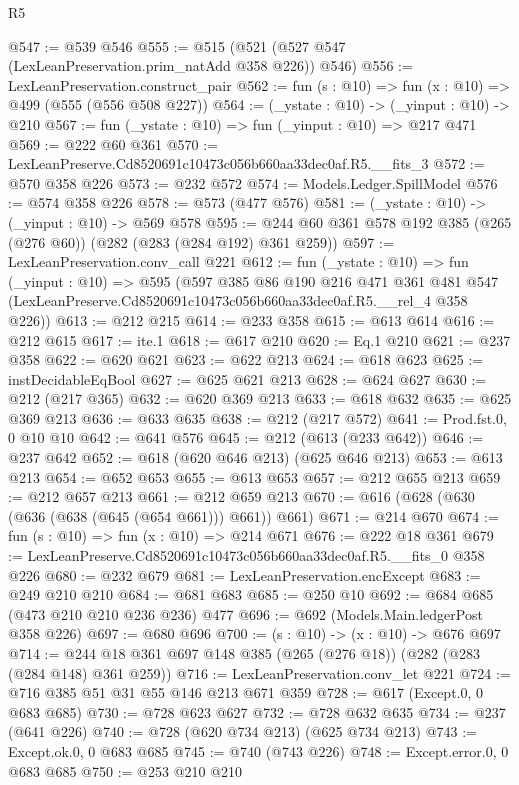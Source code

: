 \begin{lexlean}{R5}
\begin{coremodule}
@547 := @539 @546
@555 := @515 (@521 (@527 @547 (LexLeanPreservation.prim_natAdd @358 @226)) @546)
@556 := LexLeanPreservation.construct_pair
@562 := fun (s : @10) => fun (x : @10) => @499 (@555 (@556 @508 @227))
@564 := (_ystate : @10) -> (_yinput : @10) -> @210
@567 := fun (_ystate : @10) => fun (_yinput : @10) => @217 @471
@569 := @222 @60 @361
@570 := LexLeanPreserve.Cd8520691c10473c056b660aa33dec0af.R5.__fits_3
@572 := @570 @358 @226
@573 := @232 @572
@574 := Models.Ledger.SpillModel
@576 := @574 @358 @226
@578 := @573 (@477 @576)
@581 := (_ystate : @10) -> (_yinput : @10) -> @569 @578
@595 := @244 @60 @361 @578 @192 @385 (@265 (@276 @60)) (@282 (@283 (@284 @192) @361 @259))
@597 := LexLeanPreservation.conv_call @221
@612 := fun (_ystate : @10) =>
  fun (_yinput : @10) =>
  @595
    (@597
      @385
      @86
      @190
      @216
      @471
      @361
      @481
      @547
      (LexLeanPreserve.Cd8520691c10473c056b660aa33dec0af.R5.__rel_4 @358 @226))
@613 := @212 @215
@614 := @233 @358
@615 := @613 @614
@616 := @212 @615
@617 := ite.{1}
@618 := @617 @210
@620 := Eq.{1} @210
@621 := @237 @358
@622 := @620 @621
@623 := @622 @213
@624 := @618 @623
@625 := instDecidableEqBool
@627 := @625 @621 @213
@628 := @624 @627
@630 := @212 (@217 @365)
@632 := @620 @369 @213
@633 := @618 @632
@635 := @625 @369 @213
@636 := @633 @635
@638 := @212 (@217 @572)
@641 := Prod.fst.{0, 0} @10 @10
@642 := @641 @576
@645 := @212 (@613 (@233 @642))
@646 := @237 @642
@652 := @618 (@620 @646 @213) (@625 @646 @213)
@653 := @613 @213
@654 := @652 @653
@655 := @613 @653
@657 := @212 @655 @213
@659 := @212 @657 @213
@661 := @212 @659 @213
@670 := @616 (@628 (@630 (@636 (@638 (@645 (@654 @661))) @661)) @661)
@671 := @214 @670
@674 := fun (s : @10) => fun (x : @10) => @214 @671
@676 := @222 @18 @361
@679 := LexLeanPreserve.Cd8520691c10473c056b660aa33dec0af.R5.__fits_0 @358 @226
@680 := @232 @679
@681 := LexLeanPreservation.encExcept
@683 := @249 @210 @210
@684 := @681 @683
@685 := @250 @10
@692 := @684 @685 (@473 @210 @210 @236 @236) @477
@696 := @692 (Models.Main.ledgerPost @358 @226)
@697 := @680 @696
@700 := (s : @10) -> (x : @10) -> @676 @697
@714 := @244 @18 @361 @697 @148 @385 (@265 (@276 @18)) (@282 (@283 (@284 @148) @361 @259))
@716 := LexLeanPreservation.conv_let @221
@724 := @716 @385 @51 @31 @55 @146 @213 @671 @359
@728 := @617 (Except.{0, 0} @683 @685)
@730 := @728 @623 @627
@732 := @728 @632 @635
@734 := @237 (@641 @226)
@740 := @728 (@620 @734 @213) (@625 @734 @213)
@743 := Except.ok.{0, 0} @683 @685
@745 := @740 (@743 @226)
@748 := Except.error.{0, 0} @683 @685
@750 := @253 @210 @210

\end{coremodule}
\end{lexlean}
